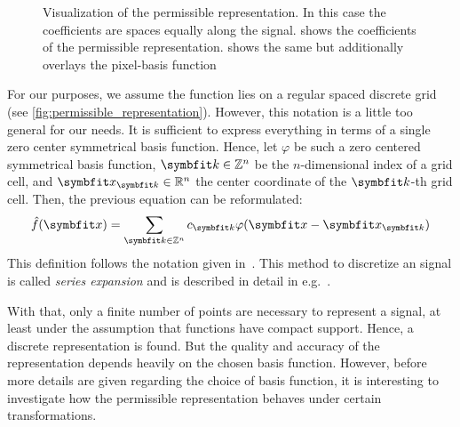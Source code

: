 \begin{figure}
	\centering
	\caption{Visualization of the permissible representation. In this case the
		coefficients are spaces equally along the signal.
		 shows the coefficients of the
		permissible representation.  shows the
		same but additionally overlays the pixel-basis function
	}\label{fig:permissible_representation}
\end{figure}

For our purposes, we assume the function lies on a regular spaced discrete grid (see
\autoref{fig:permissible_representation}). However, this notation is a little too general for our
needs. It is sufficient to express everything in terms of a single zero center symmetrical basis
function. Hence, let \(\varphi\) be such a zero centered symmetrical basis function, \(\mvec{k} \in
\mathbb{Z}^n\) be the \(n\)-dimensional index of a grid cell, and \(\mvec{x}_{\mvec{k}} \in
\mathbb{R}^n\) the center coordinate of the \(\mvec{k}\)-th grid cell. Then, the previous equation
can be reformulated:
\[ \near{f}(\mvec{x}) = \sum_{\mvec{k} \in \mathbb{Z}^n} c_{\mvec{k}} \varphi(\mvec{x} - \mvec{x}_{\mvec{k}}) \]
This definition follows the notation given in~\cite{momey_new_2011}. This method to discretize an
signal is called \textit{series expansion} and is described in detail in
e.g.~\cite{herman_basis_2015}.

With that, only a finite number of points are necessary to represent a signal, at least under the
assumption that functions have compact support. Hence, a discrete representation is found. But the
quality and accuracy of the representation depends heavily on the chosen basis function. However,
before more details are given regarding the choice of basis function, it is interesting to
investigate how the permissible representation behaves under certain transformations.

